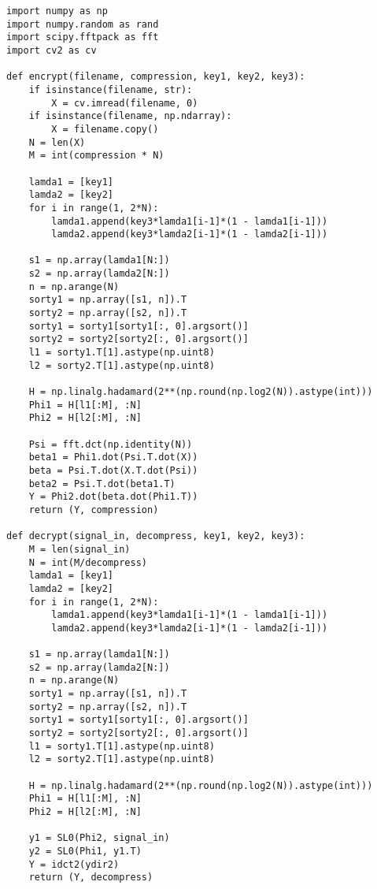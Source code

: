 \begin{lstlisting}
import numpy as np
import numpy.random as rand
import scipy.fftpack as fft
import cv2 as cv

def encrypt(filename, compression, key1, key2, key3):
	if isinstance(filename, str):
		X = cv.imread(filename, 0)
	if isinstance(filename, np.ndarray):
		X = filename.copy()
	N = len(X)
	M = int(compression * N)
	
	lamda1 = [key1]
	lamda2 = [key2]
	for i in range(1, 2*N):
		lamda1.append(key3*lamda1[i-1]*(1 - lamda1[i-1]))
		lamda2.append(key3*lamda2[i-1]*(1 - lamda2[i-1]))

	s1 = np.array(lamda1[N:])
	s2 = np.array(lamda2[N:])
	n = np.arange(N)
	sorty1 = np.array([s1, n]).T
	sorty2 = np.array([s2, n]).T
	sorty1 = sorty1[sorty1[:, 0].argsort()]
	sorty2 = sorty2[sorty2[:, 0].argsort()]
	l1 = sorty1.T[1].astype(np.uint8)
	l2 = sorty2.T[1].astype(np.uint8)
	
	H = np.linalg.hadamard(2**(np.round(np.log2(N)).astype(int)))
	Phi1 = H[l1[:M], :N]
	Phi2 = H[l2[:M], :N]
	
	Psi = fft.dct(np.identity(N))
	beta1 = Phi1.dot(Psi.T.dot(X))
	beta = Psi.T.dot(X.T.dot(Psi))
	beta2 = Psi.T.dot(beta1.T)
	Y = Phi2.dot(beta.dot(Phi1.T))
	return (Y, compression)
	
def decrypt(signal_in, decompress, key1, key2, key3):
	M = len(signal_in)
	N = int(M/decompress)
	lamda1 = [key1]
	lamda2 = [key2]
	for i in range(1, 2*N):
		lamda1.append(key3*lamda1[i-1]*(1 - lamda1[i-1]))
		lamda2.append(key3*lamda2[i-1]*(1 - lamda2[i-1]))
		
	s1 = np.array(lamda1[N:])
	s2 = np.array(lamda2[N:])
	n = np.arange(N)
	sorty1 = np.array([s1, n]).T
	sorty2 = np.array([s2, n]).T
	sorty1 = sorty1[sorty1[:, 0].argsort()]
	sorty2 = sorty2[sorty2[:, 0].argsort()]
	l1 = sorty1.T[1].astype(np.uint8)
	l2 = sorty2.T[1].astype(np.uint8)
	
	H = np.linalg.hadamard(2**(np.round(np.log2(N)).astype(int)))
	Phi1 = H[l1[:M], :N]
	Phi2 = H[l2[:M], :N]
	
	y1 = SL0(Phi2, signal_in)
	y2 = SL0(Phi1, y1.T)
	Y = idct2(ydir2)
	return (Y, decompress)
\end{lstlisting}


